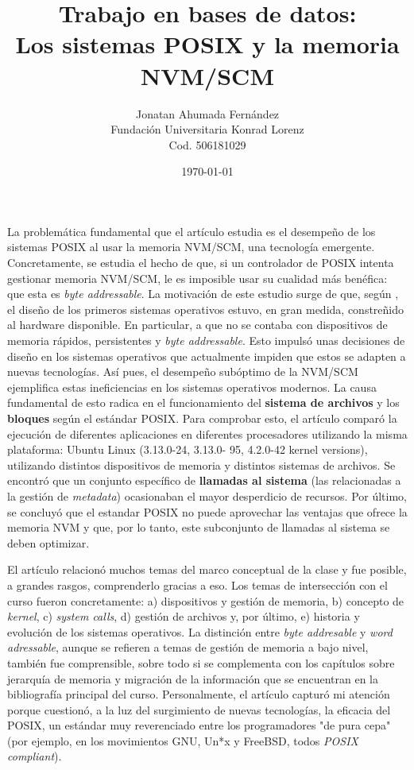 \documentclass[11pt]{article}
\author{Jonatan Ahumada Fernández\\
Fundación Universitaria Konrad Lorenz\\
Cod. 506181029}
\date{\today}
\title{Trabajo en bases de datos: \\
\large  Los sistemas POSIX y la memoria NVM/SCM}
\begin{document}


\maketitle


La problemática fundamental que el artículo estudia es el desempeño de los sistemas POSIX al usar la memoria NVM/SCM, una tecnología emergente.
Concretamente, se estudia el hecho de que, si un controlador de POSIX intenta gestionar memoria NVM/SCM, le es imposible usar su cualidad más benéfica: que esta es \emph{byte addressable}. 
La motivación de este estudio surge de que, según \cite{article:posix}, el diseño de los primeros sistemas operativos estuvo, en gran medida, constreñido al hardware disponible. En particular, a que no se contaba con
 dispositivos de memoria rápidos, persistentes y \emph{byte addressable}. Esto impulsó unas decisiones de diseño en los sistemas operativos que actualmente impiden que estos se adapten a nuevas tecnologías.
 Así pues, el desempeño subóptimo de la NVM/SCM ejemplifica estas  ineficiencias en los sistemas operativos modernos.
La causa fundamental de esto radica en el funcionamiento del \textbf{sistema de archivos} y los \textbf{bloques}  según el estándar POSIX. 
Para comprobar esto, el artículo comparó la ejecución de diferentes aplicaciones en diferentes procesadores utilizando la misma plataforma:
 Ubuntu Linux (3.13.0-24, 3.13.0- 95, 4.2.0-42 kernel versions), utilizando
distintos dispositivos de memoria y distintos sistemas de archivos. Se encontró que un conjunto específico de \textbf{llamadas al sistema} (las relacionadas a la gestión de \emph{metadata})
 ocasionaban el mayor desperdicio de recursos. Por último, se concluyó que el estandar POSIX no puede aprovechar las ventajas que ofrece la memoria NVM y que, por lo tanto, este subconjunto 
de llamadas al sistema se deben optimizar.

El artículo relacionó muchos temas del marco conceptual de la clase y fue posible, a grandes rasgos, comprenderlo gracias a eso. Los temas de intersección con el
curso fueron concretamente: a) dispositivos y gestión de memoria, b) concepto de \emph{kernel}, c) \emph{system calls}, d) gestión de archivos y, por último,
e) historia y evolución de los sistemas operativos. La distinción entre \emph{byte addresable} y \emph{word adressable}, aunque se refieren a temas de gestión de memoria a bajo nivel,
 también fue comprensible, sobre todo si se complementa con los 
capítulos sobre jerarquía de memoria y migración de la información que se encuentran en la bibliografía principal del curso. Personalmente, el artículo capturó mi atención
porque cuestionó, a la luz del surgimiento de nuevas tecnologías, la eficacia del POSIX, un estándar muy reverenciado  entre los programadores "de pura cepa" (por ejemplo, en los movimientos  GNU, Un*x y FreeBSD, todos \emph{POSIX compliant}).


\end{document}
